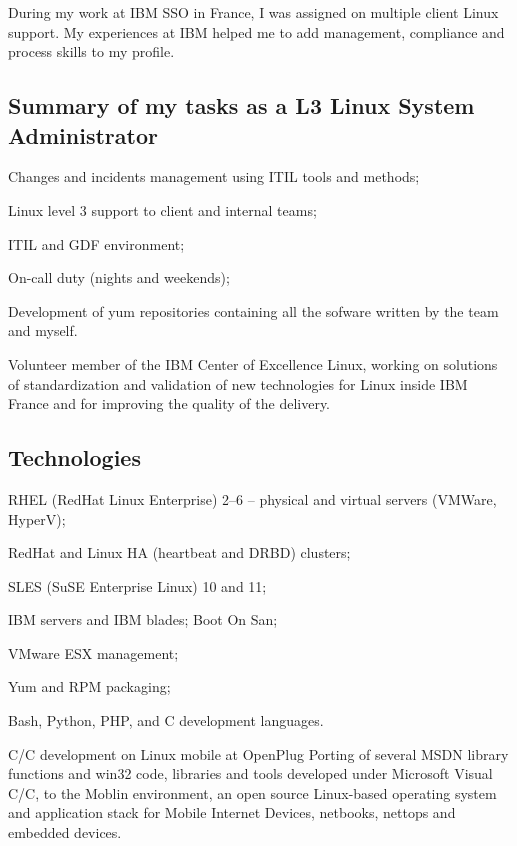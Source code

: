 During my work at IBM SSO in France, I was assigned on multiple client Linux support.
My experiences at IBM helped me to add management, compliance and process skills 
to my profile. 

\subsection{Summary of my tasks as a L3 Linux System Administrator}

\item{\bdot} Changes and incidents management using ITIL tools and methods;
\item{\bdot} Linux level 3 support to client and internal teams;
\item{\bdot} ITIL and GDF environment;
\item{\bdot} On-call duty (nights and weekends);
\item{\bdot} Development of yum repositories containing all the sofware 
   written by the team and myself.

\smallskip\noindent
Volunteer member of the IBM Center of Excellence Linux, working on solutions of 
standardization and validation of new technologies for Linux inside IBM France and
for improving the quality of the delivery.

\subsection{Technologies}

\item{\bdot} RHEL (RedHat Linux Enterprise) 2--6 -- physical and virtual 
   servers (VMWare, HyperV);
\item{\bdot} RedHat and Linux HA (heartbeat and DRBD) clusters;
\item{\bdot} SLES (SuSE Enterprise Linux) 10 and 11;
\item{\bdot} IBM servers and IBM blades; Boot On San;
\item{\bdot} VMware ESX management;
\item{\bdot} Yum and RPM packaging;
\item{\bdot} Bash, Python, PHP, and C development languages.


\bigskip
{}
   {C/C\plusplus{} development on Linux mobile at OpenPlug}
Porting of several MSDN library functions and win32 code, libraries and tools
developed under Microsoft Visual C/C\plusplus, to the Moblin environment,
an open source Linux-based operating system and application stack for
Mobile Internet Devices, netbooks, nettops and embedded devices.

